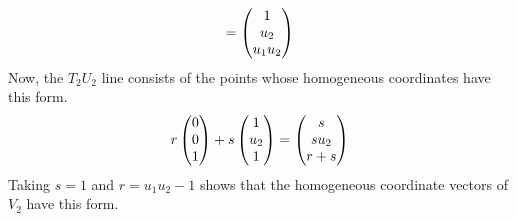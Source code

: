 \begin{exercises}
\begin{answer}
\begin{exparts}
\begin{equation*}
             =\begin{pmatrix} 1 \\ u_2 \\ u_1u_2 \end{pmatrix}
           \end{equation*}
           Now, the $T_2U_2$ line consists of the points whose homogeneous 
           coordinates have this form.
           \begin{equation*}
             r\begin{pmatrix} 0 \\ 0 \\ 1 \end{pmatrix}+s\begin{pmatrix} 1 \\ u_2 \\ 1 \end{pmatrix}
             =\begin{pmatrix} s \\ su_2 \\ r+s \end{pmatrix}
           \end{equation*}
           Taking $s=1$ and $r=u_1u_2-1$ shows that the
           homogeneous coordinate vectors of $V_2$ have this form.
      \end{exparts}
    \end{answer}
\end{exercises}
\endinput
